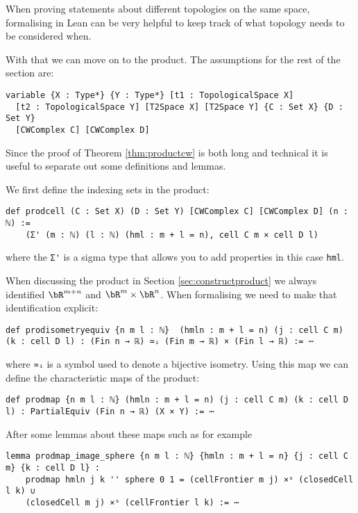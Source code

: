 When proving statements about different topologies on the same space, formalising in Lean can be very helpful to keep track of what topology needs to be considered when. 

With that we can move on to the product. 
The assumptions for the rest of the section are:

\begin{lstlisting}
variable {X : Type*} {Y : Type*} [t1 : TopologicalSpace X] 
  [t2 : TopologicalSpace Y] [T2Space X] [T2Space Y] {C : Set X} {D : Set Y} 
  [CWComplex C] [CWComplex D]
\end{lstlisting}

Since the proof of Theorem \ref{thm:productcw} is both long and technical it is useful to separate out some definitions and lemmas. 

We first define the indexing sets in the product:

\begin{lstlisting}
def prodcell (C : Set X) (D : Set Y) [CWComplex C] [CWComplex D] (n : ℕ) :=
    (Σ' (m : ℕ) (l : ℕ) (hml : m + l = n), cell C m × cell D l)
\end{lstlisting}

where the \lstinline{Σ'} is a sigma type that allows you to add properties in this case \lstinline{hml}. 

When discussing the product in Section \ref{sec:constructproduct} we always identified $\bR^{m + n}$ and $\bR^m \times \bR^n$. 
When formalising we need to make that identification explicit: 

\begin{lstlisting}
def prodisometryequiv {n m l : ℕ}  (hmln : m + l = n) (j : cell C m) (k : cell D l) : (Fin n → ℝ) ≃ᵢ (Fin m → ℝ) × (Fin l → ℝ) := ⋯
\end{lstlisting}

where \lstinline{≃ᵢ} is a symbol used to denote a bijective isometry. 
Using this map we can define the characteristic maps of the product: 

\begin{lstlisting}
def prodmap {n m l : ℕ} (hmln : m + l = n) (j : cell C m) (k : cell D l) : PartialEquiv (Fin n → ℝ) (X × Y) := ⋯
\end{lstlisting}

After some lemmas about these maps such as for example 

\begin{lstlisting}
lemma prodmap_image_sphere {n m l : ℕ} {hmln : m + l = n} {j : cell C m} {k : cell D l} :
    prodmap hmln j k '' sphere 0 1 = (cellFrontier m j) ×ˢ (closedCell l k) ∪
    (closedCell m j) ×ˢ (cellFrontier l k) := ⋯
\end{lstlisting}

